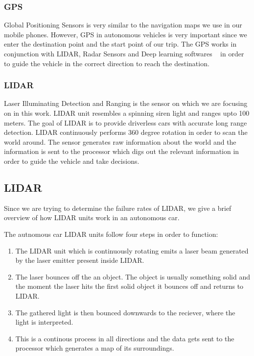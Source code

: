 \subsubsection{GPS}
Global Positioning Sensors is very similar to the navigation maps we use in our mobile phones. However, GPS in autonomous vehicles is very important since we enter the destination point and the start point of our trip. The GPS works in conjunction with LIDAR, Radar Sensors and Deep learning softwares ~\cite{GPS} in order to guide the vehicle in the correct direction to reach the destination.

\subsubsection{LIDAR}
Laser Illuminating Detection and Ranging is the sensor on which we are focusing on in this work. LIDAR unit resembles a spinning siren light and ranges upto 100 meters. The goal of LIDAR is to provide driverless cars with accurate long range detection. LIDAR continuously performs 360 degree rotation in order to scan the world around. The sensor generates raw information about the world and the information is sent to the processor which digs out the relevant information in order to guide the vehicle and take decisions.

\subsection{LIDAR}
Since we are trying to determine the failure rates of LIDAR, we give a brief overview of how LIDAR units work in an autonomous car.

The autnomous car LIDAR units follow four steps in order to function:
\begin{enumerate}
	\item The LIDAR unit which is continuously rotating emits a laser beam generated by the laser emitter present inside LIDAR.
	\item The laser bounces off the an object. The object is usually something solid and the moment the laser hits the first solid object it bounces off and returns to LIDAR.
	\item The gathered light is then bounced downwards to the reciever, where the light is interpreted. 
	\item This is a continous process in all directions and the data gets sent to the processor which generates a map of its surroundings.
\end{enumerate}